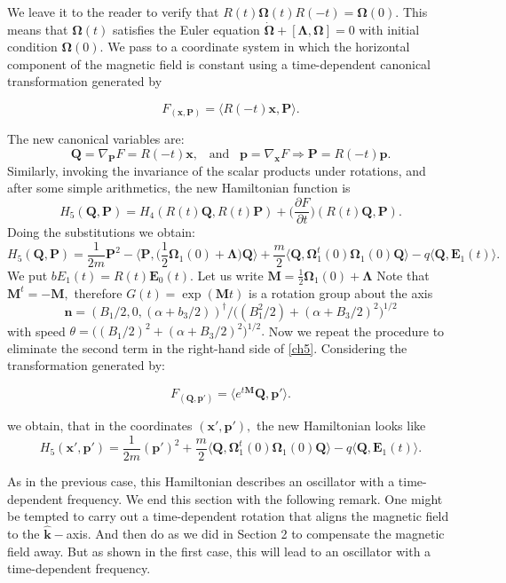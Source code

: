\documentclass[12pt]{article}
\numberwithin{equation}{section}
\newcommand{\bOm}{{\boldsymbol \Omega}}
\newcommand{\bLambda}{{\boldsymbol \Lambda}}
\def\bk{{\boldsymbol k}}
\def\bp{{\boldsymbol p}}
\def\bP{{\boldsymbol P}}
\def\bE{{\boldsymbol E}}
\def\bQ{{\boldsymbol Q}}
\def\bx{{\boldsymbol x}}
\def\bM{{\boldsymbol M}}
\def\bn{{\boldsymbol n}}
\begin{document}
We leave it to the reader to verify that $R(t)\bOm(t)R(-t) = \bOm(0).$ This means that $\bOm(t)$ satisfies the Euler equation $\dot{\bOm} + [\bLambda,\bOm]=0$ with initial condition $\bOm(0).$
We pass to a coordinate system in which the horizontal component of the magnetic field is constant using a time-dependent canonical transformation generated by

\begin{equation}\label{CT3}
F_(\bx,\bP) = \langle R(-t)\bx,\bP\rangle.
\end{equation}

 The new canonical variables are:
 \begin{equation}\label{ct3.1}
 \bQ = \nabla_{\bP}F = R(-t)\bx,\;\;\;\mbox{and}\;\;\;\bp = \nabla_{\bx}F\Rightarrow \bP=R(-t)\bp.
 \end{equation}
 Similarly, invoking the invariance of the scalar products under rotations, and after some simple arithmetics, the new Hamiltonian function is
 $$H_5(\bQ,\bP) = H_4(R(t)\bQ,R(t)\bP) + \bigg(\frac{\partial F}{\partial t}\bigg)(R(t)\bQ,\bP).$$
 Doing the substitutions we obtain:
 \begin{equation}\label{ch5}
 H_5(\bQ,\bP) = \frac{1}{2m}\bP^2 -  \langle\bP,\big(\frac{1}{2}\bOm_1(0) + \bLambda\big)\bQ\rangle + \frac{m}{2}\langle\bQ,\bOm_1^t(0)\bOm_1(0)\bQ\rangle - q\langle\bQ,\bE_1(t)\rangle.
 \end{equation}
 We put $bE_1(t)=R(t)\bE_0(t).$ Let us write $\bM=\frac{1}{2}\bOm_1(0) + \bLambda$ Note that $\bM^t=-\bM,$ therefore $G(t)=\exp(\bM t)$ is a rotation group about the axis
 $$\bn=\left(B_1/2,0,(\alpha+b_3/2)\right)^\dag/\big((B_1^2/2)+(\alpha+B_3/2)^2\big)^{1/2}$$
 with speed $\theta=\big((B_1/2)^2+(\alpha+B_3/2)^2\big)^{1/2}.$ Now we repeat the procedure to eliminate the second term in the right-hand side of \eqref{ch5}. Considering the
 transformation generated by:
 
 \begin{equation}\label{CT4}
 F_(\bQ,\bp') = \langle e^{t\bM}\bQ,\bp'\rangle.
\end{equation}

we obtain, that in the coordinates $(\bx',\bp'),$ the new Hamiltonian looks like
  \begin{equation}\label{ch5}
 H_5(\bx',\bp') =  \frac{1}{2m}(\bp')^2  + \frac{m}{2}\langle\bQ,\bOm_1^t(0)\bOm_1(0)\bQ\rangle - q\langle\bQ,\bE_1(t)\rangle.
 \end{equation}
 
 As in the previous case, this Hamiltonian describes an oscillator with a time-dependent frequency. We end this section with the following remark. One might be tempted to carry out a time-dependent rotation that aligns the magnetic field to the $\hat{\bk}-$axis. And then do as we did in Section 2 to compensate the magnetic field away.  But as shown in the first case, this will lead to an oscillator with a time-dependent frequency. 
 
\end{document}
